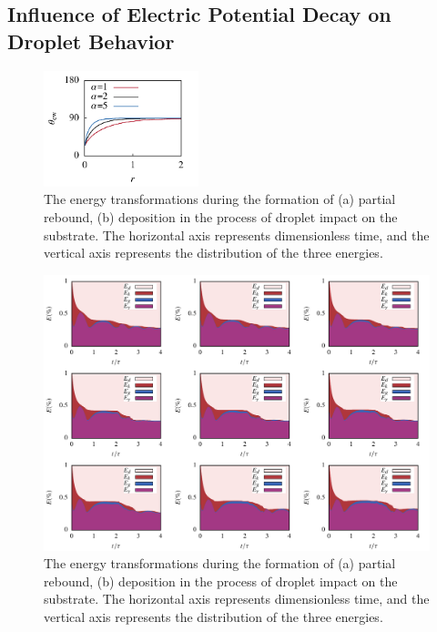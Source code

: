 \documentclass[lineno]{cls/jfm}
\begin{document}
\subsection{Influence of Electric Potential Decay on Droplet Behavior}

 \begin{figure}
  \centerline{\includegraphics[width=0.4\textwidth]{fig/decay.pdf}}
  \caption{The energy transformations during the formation of (a) partial rebound, (b) deposition in the process of droplet impact on the substrate. The horizontal axis represents dimensionless time, and the vertical axis represents the distribution of the three energies.}
 \label{fig:energy}
 \end{figure}

 \begin{figure}
  \centerline{\includegraphics[width=1.0\textwidth]{fig/dropETC.pdf}}
  \caption{The energy transformations during the formation of (a) partial rebound, (b) deposition in the process of droplet impact on the substrate. The horizontal axis represents dimensionless time, and the vertical axis represents the distribution of the three energies.}
 \label{fig:energy}
 \end{figure}
\end{document}
